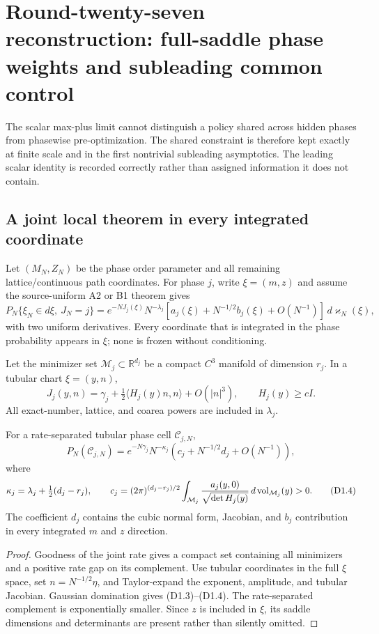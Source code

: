
\section{Round-twenty-seven reconstruction: full-saddle phase weights and subleading common control}
\label{sec:r27-d1}

The scalar max-plus limit cannot distinguish a policy shared across hidden
phases from phasewise pre-optimization.  The shared constraint is therefore
kept exactly at finite scale and in the first nontrivial subleading
asymptotics.  The leading scalar identity is recorded correctly rather than
assigned information it does not contain.

\subsection{A joint local theorem in every integrated coordinate}

Let $(M_N,Z_N)$ be the phase order parameter and all remaining
lattice/continuous path coordinates.  For phase $j$, write
$\xi=(m,z)$ and assume the source-uniform A2 or B1 theorem gives
\[
 P_N\{\xi_N\in d\xi,\ J_N=j\}
 =e^{-NJ_j(\xi)}N^{-\lambda_j}
 \left[a_j(\xi)+N^{-1/2}b_j(\xi)+O(N^{-1})\right]\,d\varkappa_N(\xi),   \tag{D1.1}
\]
with two uniform derivatives.  Every coordinate that is integrated in the
phase probability appears in $\xi$; none is frozen without conditioning.

Let the minimizer set $\mathcal M_j\subset\mathbb R^{d_j}$ be a compact
$C^3$ manifold of dimension $r_j$.  In a tubular chart
$\xi=(y,n)$,
\[
 J_j(y,n)=\gamma_j+\tfrac12
 \langle H_j(y)n,n\rangle+O(|n|^3),\qquad H_j(y)\ge cI.    \tag{D1.2}
\]
All exact-number, lattice, and coarea powers are included in $\lambda_j$.

\begin{theorem}
\label{thm:r27-d1-weight}
For a rate-separated tubular phase cell $\mathcal C_{j,N}$,
\[
 P_N(\mathcal C_{j,N})
 =e^{-N\gamma_j}N^{-\kappa_j}
 \left(c_j+N^{-1/2}d_j+O(N^{-1})\right),                  \tag{D1.3}
\]
where
\[
 \kappa_j=\lambda_j+\tfrac12(d_j-r_j),\qquad
 c_j=(2\pi)^{(d_j-r_j)/2}
 \int_{\mathcal M_j}{a_j(y,0)\over\sqrt{\det H_j(y)}}\,
 d\operatorname{vol}_{\mathcal M_j}(y)>0.                 \tag{D1.4}
\]
The coefficient $d_j$ contains the cubic normal form, Jacobian, and
$b_j$ contribution in every integrated $m$ and $z$ direction.
\end{theorem}

\begin{proof}
Goodness of the joint rate gives a compact set containing all minimizers and
a positive rate gap on its complement.  Use tubular coordinates in the full
$\xi$ space, set $n=N^{-1/2}\eta$, and Taylor-expand the exponent, amplitude,
and tubular Jacobian.  Gaussian domination gives (D1.3)--(D1.4).  The
rate-separated complement is exponentially smaller.  Since $z$ is included
in $\xi$, its saddle dimensions and determinants are present rather than
silently omitted.
\end{proof}

